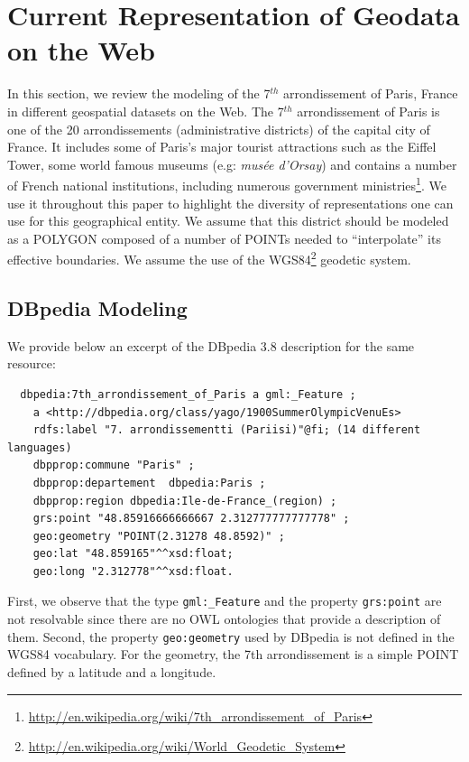 \section{Current Representation of Geodata on the Web}\label{sec:scenario}
In this section, we review the modeling of the 7$^{th}$ arrondissement of Paris, France in different geospatial datasets on the Web. The 7$^{th}$ arrondissement of Paris is one of the 20 arrondissements (administrative districts) of the capital city of France. It includes some of Paris's major tourist attractions such as the Eiffel Tower, some world famous museums (e.g: \textit{mus\'{e}e d'Orsay}) and contains a number of French national institutions, including numerous government ministries\footnote{\url{http://en.wikipedia.org/wiki/7th_arrondissement_of_Paris}}. We use it throughout this paper to highlight the diversity of representations one can use for this geographical entity. We assume that this district should be modeled as a POLYGON composed of a number of POINTs needed to ``interpolate'' its effective boundaries. We assume the use of the WGS84\footnote{\url{http://en.wikipedia.org/wiki/World_Geodetic_System}} geodetic system.


\subsection{DBpedia Modeling}
We provide below an excerpt of the DBpedia 3.8 description for the same resource:
{\small
\begin{verbatim}
  dbpedia:7th_arrondissement_of_Paris a gml:_Feature ;
    a <http://dbpedia.org/class/yago/1900SummerOlympicVenuEs>
    rdfs:label "7. arrondissementti (Pariisi)"@fi; (14 different languages)
    dbpprop:commune "Paris" ;
    dbpprop:departement  dbpedia:Paris ;
    dbpprop:region dbpedia:Ile-de-France_(region) ;
    grs:point "48.85916666666667 2.312777777777778" ;
    geo:geometry "POINT(2.31278 48.8592)" ;
    geo:lat "48.859165"^^xsd:float;
    geo:long "2.312778"^^xsd:float.
\end{verbatim}
}
First, we observe that the type \texttt{gml:\_Feature} and the property \texttt{grs:point} are not resolvable since there are no OWL ontologies that provide a description of them. Second, the property \texttt{geo:geometry} used by DBpedia is not defined in the WGS84 vocabulary. For the geometry, the 7th arrondissement is a simple POINT defined by a latitude and a longitude.

